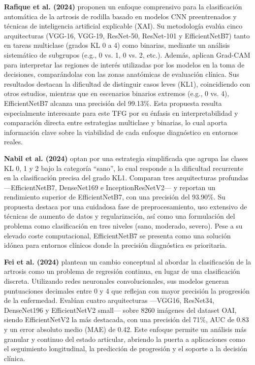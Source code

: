 \documentclass[11pt,spanish,listoffigures,listoftables]{tfgetsinf}
\begin{document}
\textbf{Rafique et al. (2024)} \cite{rafique2024knee} proponen un enfoque comprensivo para la clasificación automática de la artrosis 
de rodilla basado en modelos CNN preentrenados y técnicas de inteligencia artificial explicable (XAI). Su metodología evalúa cinco 
arquitecturas (VGG-16, VGG-19, ResNet-50, ResNet-101 y EfficientNetB7) tanto en tareas multiclase (grados KL 0 a 4) como binarias, 
mediante un análisis sistemático de subgrupos (e.g., 0 vs. 1, 0 vs. 2, etc.). Además, aplican Grad-CAM para interpretar las regiones 
de interés utilizadas por los modelos en la toma de decisiones, comparándolas con las zonas anatómicas de evaluación clínica. Sus 
resultados destacan la dificultad de distinguir casos leves (KL1), coincidiendo con otros estudios, mientras que en escenarios binarios 
extremos (e.g., 0 vs. 4), EfficientNetB7 alcanza una precisión del 99.13\%. Esta propuesta resulta especialmente interesante para 
este TFG por su énfasis en interpretabilidad y comparación directa entre estrategias multiclase y binarias, lo cual aporta 
información clave sobre la viabilidad de cada enfoque diagnóstico en entornos reales.

\textbf{Nabil et al. (2024)} \cite{nabil2024automatic} optan por una estrategia simplificada que agrupa las clases KL 0, 1 y 2 bajo la categoría 
“sano”, lo cual responde a la dificultad recurrente en la clasificación precisa del grado KL1. Comparan tres arquitecturas profundas 
—EfficientNetB7, DenseNet169 e InceptionResNetV2— y reportan un rendimiento superior de EfficientNetB7, con una precisión del 93.90\%. 
Su propuesta destaca por una cuidadosa fase de preprocesamiento, uso extensivo de técnicas de aumento de datos y regularización, así 
como una formulación del problema como clasificación en tres niveles (sano, moderado, severo). Pese a su elevado coste computacional, 
EfficientNetB7 se presenta como una solución idónea para entornos clínicos donde la precisión diagnóstica es prioritaria.

\textbf{Fei et al. (2024)} \cite{fei2024diagnosing} plantean un cambio conceptual al abordar la clasificación de la artrosis como un problema 
de regresión continua, en lugar de una clasificación discreta. Utilizando redes neuronales convolucionales, sus modelos generan puntuaciones 
decimales entre 0 y 4 que reflejan con mayor precisión la progresión de la enfermedad. Evalúan cuatro arquitecturas —VGG16, ResNet34, 
DenseNet196 y EfficientNetV2 small— sobre 8260 imágenes del dataset OAI, siendo EfficientNetV2 la más destacada, con una precisión del 71\%, 
AUC de 0.83 y un error absoluto medio (MAE) de 0.42. Este enfoque permite un análisis más granular y continuo del estado articular, abriendo 
la puerta a aplicaciones como el seguimiento longitudinal, la predicción de progresión y el soporte a la decisión clínica.
\end{document}
